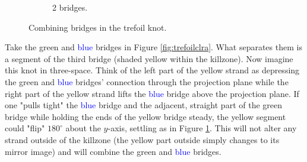 \documentclass[titlepage]{article}
\begin{document}
\begin{figure}[h!]
\begin{subfigure}[b]{0.3\linewidth}
        \caption{2 bridges.}
        \label{fig:trefoilclrb}
    \end{subfigure}
    \caption{Combining bridges in the trefoil knot.}
    \label{fig:trefoilclr}
\end{figure}

Take the \textcolor{grx}{green} and \textcolor{blue}{blue} bridges in Figure \ref{fig:trefoilclra}. What separates them is a segment of the third bridge (shaded \textcolor{ylx}{yellow} within the killzone). Now imagine this knot in three-space. Think of the left part of the \textcolor{ylx}{yellow} strand as depressing the \textcolor{grx}{green} and \textcolor{blue}{blue} bridges' connection through the projection plane while the right part of the \textcolor{ylx}{yellow} strand lifts the \textcolor{blue}{blue} bridge above the projection plane. If one "pulls tight" the \textcolor{blue}{blue} bridge and the adjacent, straight part of the \textcolor{grx}{green} bridge while holding the ends of the \textcolor{ylx}{yellow} bridge steady, the \textcolor{ylx}{yellow} segment could "flip" $180^\circ$ about the $y$-axis, settling as in Figure \ref{fig:trefoilclrb}. This will not alter any strand outside of the killzone (the \textcolor{ylx}{yellow} part outside simply changes to its mirror image) and will combine the \textcolor{grx}{green} and \textcolor{blue}{blue} bridges.\par
\end{document}

